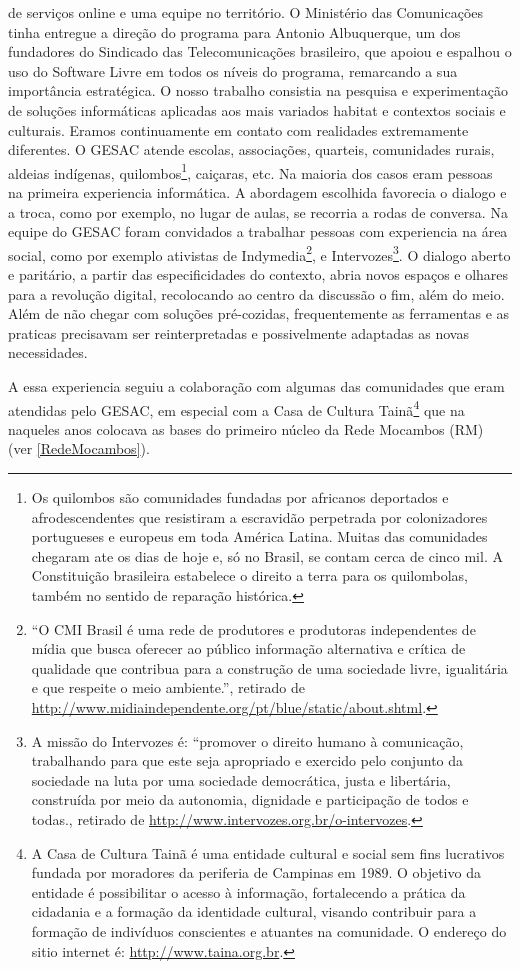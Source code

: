 de serviços online e uma equipe no território. O Ministério das
Comunicações tinha entregue a direção do programa para Antonio
Albuquerque, um dos fundadores do Sindicado das Telecomunicações
brasileiro, que apoiou e espalhou o uso do Software Livre em todos os
níveis do programa, remarcando a sua importância estratégica. O nosso
trabalho consistia na pesquisa e experimentação de soluções
informáticas aplicadas aos mais variados habitat e contextos sociais e
culturais. Eramos continuamente em contato com realidades extremamente
diferentes. O GESAC atende escolas, associações, quarteis, comunidades
rurais, aldeias indígenas, quilombos\footnote{Os quilombos são
  comunidades fundadas por africanos deportados e afrodescendentes que
  resistiram a escravidão perpetrada por colonizadores portugueses e
  europeus em toda América Latina. Muitas das comunidades chegaram ate
  os dias de hoje e, só no Brasil, se contam cerca de cinco mil. A
  Constituição brasileira estabelece o direito a terra para os
  quilombolas, também no sentido de reparação histórica.}, caiçaras,
etc. Na maioria dos casos eram pessoas na primeira experiencia
informática. A abordagem escolhida favorecia o dialogo e a troca, como
por exemplo, no lugar de aulas, se recorria a rodas de conversa. Na
equipe do GESAC foram convidados a trabalhar pessoas com experiencia
na área social, como por exemplo ativistas de Indymedia\footnote{``O
  CMI Brasil é uma rede de produtores e produtoras independentes de
  mídia que busca oferecer ao público informação alternativa e crítica
  de qualidade que contribua para a construção de uma sociedade livre,
  igualitária e que respeite o meio ambiente.'', retirado de
  \url{http://www.midiaindependente.org/pt/blue/static/about.shtml}.},
e Intervozes\footnote{A missão do Intervozes é: ``promover o direito
  humano à comunicação, trabalhando para que este seja apropriado e
  exercido pelo conjunto da sociedade na luta por uma sociedade
  democrática, justa e libertária, construída por meio da autonomia,
  dignidade e participação de todos e todas., retirado de
  \url{http://www.intervozes.org.br/o-intervozes}.}. O dialogo aberto
e paritário, a partir das especificidades do contexto, abria novos
espaços e olhares para a revolução digital, recolocando ao centro da
discussão o fim, além do meio. Além de não chegar com soluções
pré-cozidas, frequentemente as ferramentas e as praticas precisavam
ser reinterpretadas e possivelmente adaptadas as novas necessidades.

A essa experiencia seguiu a colaboração com algumas das comunidades
que eram atendidas pelo GESAC, em especial com a Casa de Cultura
Tainã\footnote{A Casa de Cultura Tainã é uma entidade cultural e
  social sem fins lucrativos fundada por moradores da periferia de
  Campinas em 1989.  O objetivo da entidade é possibilitar o acesso à
  informação, fortalecendo a prática da cidadania e a formação da
  identidade cultural, visando contribuir para a formação de
  indivíduos conscientes e atuantes na comunidade. O endereço do sitio
  internet é: \url{http://www.taina.org.br}.} que na naqueles anos
colocava as bases do primeiro núcleo da Rede Mocambos (RM) (ver
\ref{RedeMocambos}).

